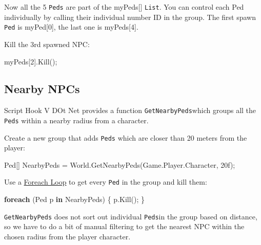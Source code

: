 \documentclass[
  openany]{book}
\newenvironment{Shaded}{\begin{snugshade}}{\end{snugshade}}
\newcommand{\DecValTok}[1]{\textcolor[rgb]{0.00,0.00,0.81}{#1}}
\newcommand{\FunctionTok}[1]{\textcolor[rgb]{0.00,0.00,0.00}{#1}}
\newcommand{\KeywordTok}[1]{\textcolor[rgb]{0.13,0.29,0.53}{\textbf{#1}}}
\newcommand{\NormalTok}[1]{#1}
\begin{document}
Now all the 5 \texttt{Peds} are part of the myPeds{[}{]} \texttt{List}. You can control each Ped individually by calling their individual number ID in the group. The first spawn \texttt{Ped} is myPed{[}0{]}, the last one is myPeds{[}4{]}.

Kill the 3rd spawned NPC:

\begin{Shaded}
\begin{Highlighting}[]
\NormalTok{myPeds[}\DecValTok{2}\NormalTok{].}\FunctionTok{Kill}\NormalTok{();}
\end{Highlighting}
\end{Shaded}

\hypertarget{nearby-npcs}{%
\subsection*{Nearby NPCs}\label{nearby-npcs}}

Script Hook V DOt Net provides a function \texttt{GetNearbyPeds}which groups all the \texttt{Peds} within a nearby radius from a character.

Create a new group that adds \texttt{Peds} which are closer than 20 meters from the player:

\begin{Shaded}
\begin{Highlighting}[]
\NormalTok{Ped[] NearbyPeds = World.}\FunctionTok{GetNearbyPeds}\NormalTok{(Game.}\FunctionTok{Player}\NormalTok{.}\FunctionTok{Character}\NormalTok{, 20f);}
\end{Highlighting}
\end{Shaded}

Use a \href{https://www.simplilearn.com/tutorials/asp-dot-net-tutorial/csharp-foreach\#:~:text=The\%20foreach\%20loop\%20in\%20C\%23,readable\%20alternative\%20to\%20for\%20loop.}{Foreach Loop} to get every \texttt{Ped} in the group and kill them:

\begin{Shaded}
\begin{Highlighting}[]
\KeywordTok{foreach}\NormalTok{ (Ped p }\KeywordTok{in}\NormalTok{ NearbyPeds)}
\NormalTok{\{}
\NormalTok{    p.}\FunctionTok{Kill}\NormalTok{();}
\NormalTok{\}}
\end{Highlighting}
\end{Shaded}

\texttt{GetNearbyPeds} does not sort out individual \texttt{Peds}in the group based on distance, so we have to do a bit of manual filtering to get the nearest NPC within the chosen radius from the player character.
\end{document}

